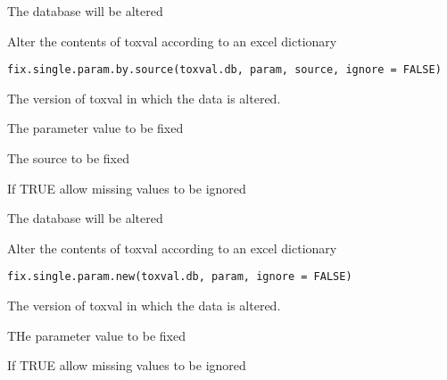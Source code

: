 \documentclass[letterpaper]{book}
\begin{document}
%
\begin{Value}
The database will be altered
\end{Value}
%
\begin{Description}\relax
Alter the contents of toxval according to an excel dictionary
\end{Description}
%
\begin{Usage}
\begin{verbatim}
fix.single.param.by.source(toxval.db, param, source, ignore = FALSE)
\end{verbatim}
\end{Usage}
%
\begin{Arguments}
\begin{ldescription}
\item[\code{toxval.db}] The version of toxval in which the data is altered.

\item[\code{param}] The parameter value to be fixed

\item[\code{source}] The source to be fixed

\item[\code{ignore}] If TRUE allow missing values to be ignored
\end{ldescription}
\end{Arguments}
%
\begin{Value}
The database will be altered
\end{Value}
%
\begin{Description}\relax
Alter the contents of toxval according to an excel dictionary
\end{Description}
%
\begin{Usage}
\begin{verbatim}
fix.single.param.new(toxval.db, param, ignore = FALSE)
\end{verbatim}
\end{Usage}
%
\begin{Arguments}
\begin{ldescription}
\item[\code{toxval.db}] The version of toxval in which the data is altered.

\item[\code{param}] THe parameter value to be fixed

\item[\code{ignore}] If TRUE allow missing values to be ignored
\end{ldescription}
\end{Arguments}
\end{document}
